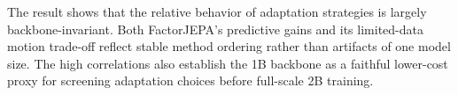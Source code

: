 The result shows that the relative behavior of adaptation strategies is largely
backbone-invariant. Both FactorJEPA's predictive gains and its limited-data
motion trade-off reflect stable method ordering rather than artifacts of one
model size. The high correlations also establish the 1B backbone as a faithful
lower-cost proxy for screening adaptation choices before full-scale 2B
training.













































